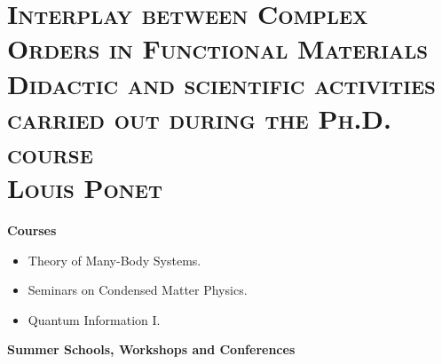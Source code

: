 \documentclass[10pt, a4paper]{article}
\begin{document}
\section*{\textsc{{\huge Interplay between Complex Orders in Functional Materials}\\[0.1cm] Didactic and scientific activities carried out during the Ph.D. course\\[0.2cm] {\normalsize Louis Ponet}}}

\vspace{0.4cm}
{\bf Courses}
\begin{itemize}
\item
Theory of Many-Body Systems.
\item
Seminars on Condensed Matter Physics.
\item
Quantum Information I.
\end{itemize}
\vspace{0.4cm}
{\bf Summer Schools, Workshops and Conferences}
\end{document}
